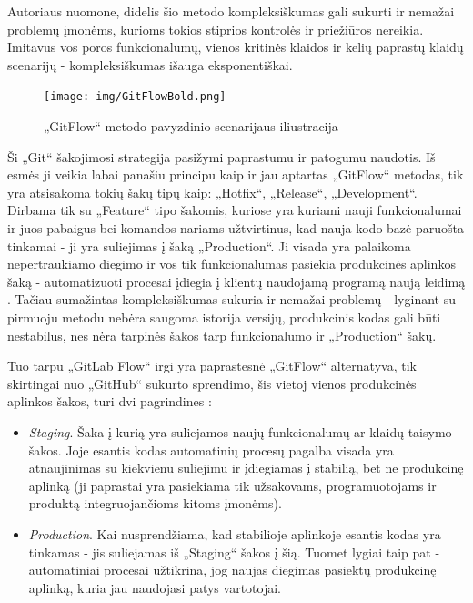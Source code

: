 \documentclass{VUMIFPSkursinis}
\begin{document}
Autoriaus nuomone, didelis šio metodo kompleksiškumas gali sukurti ir nemažai problemų įmonėms, kurioms tokios stiprios kontrolės ir priežiūros nereikia. Imitavus vos poros funkcionalumų, vienos kritinės klaidos ir kelių paprastų klaidų scenarijų - kompleksiškumas išauga eksponentiškai.

\begin{figure}[H]
    \centering
    \texttt{[image: img/GitFlowBold.png]}
    \caption{„GitFlow“ metodo pavyzdinio scenarijaus iliustracija}
    \label{img:mlp}
\end{figure}


Ši „Git“ šakojimosi strategija pasižymi paprastumu ir patogumu naudotis. Iš esmės ji veikia labai panašiu principu kaip ir jau aptartas „GitFlow“ metodas, tik yra atsisakoma tokių šakų tipų kaip: „Hotfix“, „Release“, „Development“. Dirbama tik su „Feature“ tipo šakomis, kuriose yra kuriami nauji funkcionalumai ir juos pabaigus bei komandos nariams užtvirtinus, kad nauja kodo bazė paruošta tinkamai - ji yra suliejimas į šaką „Production“. Ji visada yra palaikoma nepertraukiamo diegimo ir vos tik funkcionalumas pasiekia produkcinės aplinkos šaką - automatizuoti procesai įdiegia į klientų naudojamą programą naują leidimą \cite{SaltDevintas}. Tačiau sumažintas kompleksiškumas sukuria ir nemažai problemų - lyginant su pirmuoju metodu nebėra saugoma istorija versijų, produkcinis kodas gali būti nestabilus, nes nėra tarpinės šakos tarp funkcionalumo ir „Production“ šakų.

Tuo tarpu „GitLab Flow“ irgi yra paprastesnė „GitFlow“ alternatyva, tik skirtingai nuo „GitHub“ sukurto sprendimo, šis vietoj vienos produkcinės aplinkos šakos, turi dvi pagrindines \cite{SaltDesimtas}:

\begin{itemize}
  \item \textit{Staging}. Šaka į kurią yra suliejamos naujų funkcionalumų ar klaidų taisymo šakos. Joje esantis kodas automatinių procesų pagalba visada yra atnaujinimas su kiekvienu suliejimu ir įdiegiamas į stabilią, bet ne produkcinę aplinką (ji paprastai yra pasiekiama tik užsakovams, programuotojams ir produktą integruojančioms kitoms įmonėms).
  
  \item \textit{Production}. Kai nusprendžiama, kad stabilioje aplinkoje esantis kodas yra tinkamas - jis suliejamas iš „Staging“ šakos į šią. Tuomet lygiai taip pat - automatiniai procesai užtikrina, jog naujas diegimas pasiektų produkcinę aplinką, kuria jau naudojasi patys vartotojai.

\end{itemize}
\end{document}
